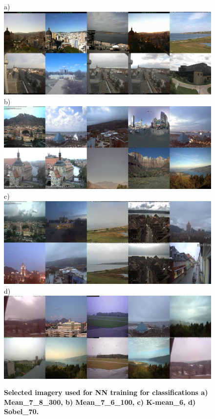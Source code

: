\documentclass[final,3p,times,authoryear]{elsarticle}
\begin{document}
\begin{figure}
\centering
a)\includegraphics[trim = 0mm 0mm 0mm 0mm,clip,scale=0.14]{Images/13-0_Mean_7_8_300_tiles.png}
b)\includegraphics[trim = 0mm 0mm 0mm 0mm,clip,scale=0.14]{Images/13-3_Mean_7_6_100_tiles.png}
c)\includegraphics[trim = 0mm 0mm 0mm 0mm,clip,scale=0.14]{Images/13-5_K-mean_6_tiles.png}
d)\includegraphics[trim = 0mm 0mm 0mm 0mm,clip,scale=0.14]{Images/13-9_Sobel_70_tiles.png}
\caption{\textbf{Selected imagery used for NN training for classifications 
a) Mean\_7\_8\_300, b) Mean\_7\_6\_100, c) K-mean\_6, d) Sobel\_70.}}
\label{fig:classImages}
\end{figure}
\end{document}
